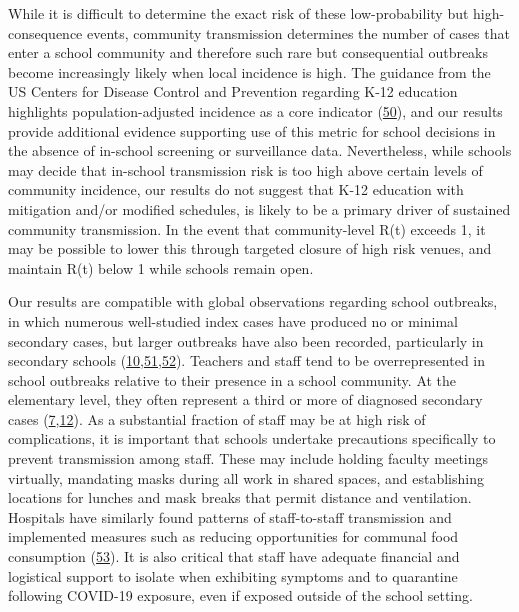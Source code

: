 \documentclass[
]{article}
\begin{document}
While it is difficult to determine the exact risk of these
low-probability but high-consequence events, community transmission
determines the number of cases that enter a school community and
therefore such rare but consequential outbreaks become increasingly
likely when local incidence is high. The guidance from the US Centers
for Disease Control and Prevention regarding K-12 education highlights
population-adjusted incidence as a core indicator
(\protect\hyperlink{ref-cdc_communities_2020}{50}), and our results
provide additional evidence supporting use of this metric for school
decisions in the absence of in-school screening or surveillance data.
Nevertheless, while schools may decide that in-school transmission risk
is too high above certain levels of community incidence, our results do
not suggest that K-12 education with mitigation and/or modified
schedules, is likely to be a primary driver of sustained community
transmission. In the event that community-level R(t) exceeds 1, it may
be possible to lower this through targeted closure of high risk venues,
and maintain R(t) below 1 while schools remain open.

Our results are compatible with global observations regarding school
outbreaks, in which numerous well-studied index cases have produced no
or minimal secondary cases, but larger outbreaks have also been
recorded, particularly in secondary schools
(\protect\hyperlink{ref-stein-zamir_large_2020}{10},\protect\hyperlink{ref-link-gelles_limited_2020}{51},\protect\hyperlink{ref-ladhani_prospective_nodate}{52}).
Teachers and staff tend to be overrepresented in school outbreaks
relative to their presence in a school community. At the elementary
level, they often represent a third or more of diagnosed secondary cases
(\protect\hyperlink{ref-macartney_transmission_2020}{7},\protect\hyperlink{ref-torres_sars-cov-2_nodate}{12}).
As a substantial fraction of staff may be at high risk of complications,
it is important that schools undertake precautions specifically to
prevent transmission among staff. These may include holding faculty
meetings virtually, mandating masks during all work in shared spaces,
and establishing locations for lunches and mask breaks that permit
distance and ventilation. Hospitals have similarly found patterns of
staff-to-staff transmission and implemented measures such as reducing
opportunities for communal food consumption
(\protect\hyperlink{ref-noauthor_bwh_nodate}{53}). It is also critical
that staff have adequate financial and logistical support to isolate
when exhibiting symptoms and to quarantine following COVID-19 exposure,
even if exposed outside of the school setting.
\end{document}
